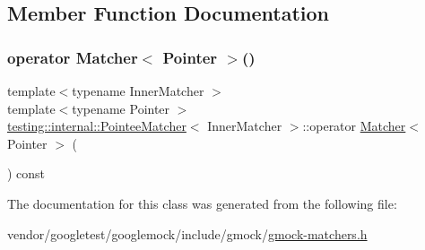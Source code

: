 \subsection{Member Function Documentation}
\mbox{\label{classtesting_1_1internal_1_1_pointee_matcher_adec012cd8d3fa166ee89236545a57772}} 
\subsubsection{\texorpdfstring{operator Matcher$<$ Pointer $>$()}{operator Matcher< Pointer >()}}
{\footnotesize\ttfamily template$<$typename Inner\+Matcher $>$ \\
template$<$typename Pointer $>$ \\
\hyperlink{classtesting_1_1internal_1_1_pointee_matcher}{testing\+::internal\+::\+Pointee\+Matcher}$<$ Inner\+Matcher $>$\+::operator \hyperlink{classtesting_1_1_matcher}{Matcher}$<$ Pointer $>$ (\begin{DoxyParamCaption}{ }\end{DoxyParamCaption}) const\hspace{0.3cm}{\ttfamily [inline]}}



The documentation for this class was generated from the following file\+:\begin{DoxyCompactItemize}
\item 
vendor/googletest/googlemock/include/gmock/\hyperlink{gmock-matchers_8h}{gmock-\/matchers.\+h}\end{DoxyCompactItemize}
